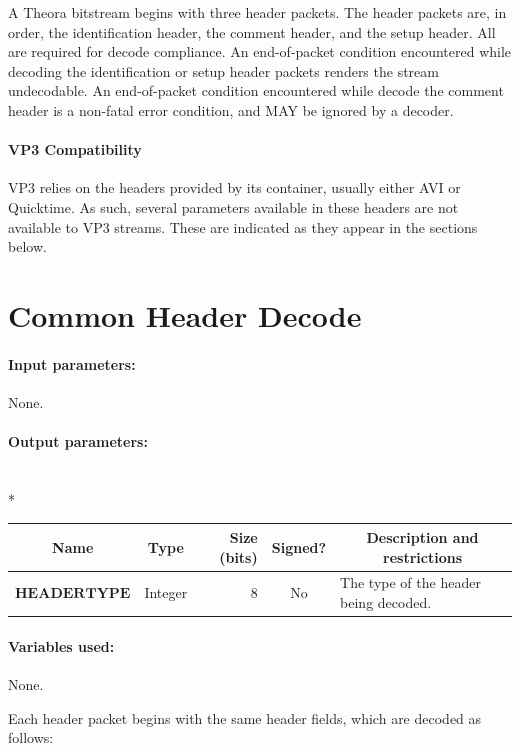 \documentclass[9pt,letterpaper]{book}
\newcommand{\bitvar}[1]{\ensuremath{\mathbf{\bm{#1}}}}
\numberwithin{equation}{chapter}
\numberwithin{figure}{chapter}
\numberwithin{table}{chapter}
\begin{document}
A Theora bitstream begins with three header packets.
The header packets are, in order, the identification header, the comment
 header, and the setup header.
All are required for decode compliance.
An end-of-packet condition encountered while decoding the identification or
 setup header packets renders the stream undecodable.
An end-of-packet condition encountered while decode the comment header is a
 non-fatal error condition, and MAY be ignored by a decoder.

\paragraph{VP3 Compatibility}

VP3 relies on the headers provided by its container, usually either AVI or
 Quicktime.
As such, several parameters available in these headers are not available to VP3
 streams.
These are indicated as they appear in the sections below.

\section{Common Header Decode}
\label{sub:common-header}

\paragraph{Input parameters:} None.

\paragraph{Output parameters:}\hfill\\*
\begin{tabularx}{\textwidth}{@{}llrcX@{}}\toprule
\multicolumn{1}{c}{Name} &
\multicolumn{1}{c}{Type} &
\multicolumn{1}{p{30pt}}{\centering Size (bits)} &
\multicolumn{1}{c}{Signed?} &
\multicolumn{1}{c}{Description and restrictions} \\\midrule\endhead
\bitvar{HEADERTYPE} & Integer & 8 & No & The type of the header being
 decoded. \\
\bottomrule\end{tabularx}

\paragraph{Variables used:} None.
\medskip

Each header packet begins with the same header fields, which are decoded as
 follows:
\end{document}
